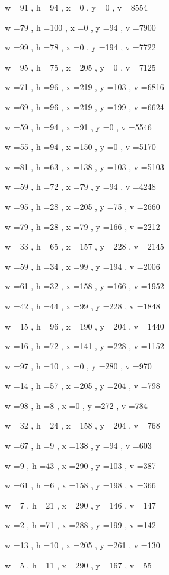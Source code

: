 \documentclass[11pt]{article}
\begin{document}
w =91 , h =94 , x =0 , y =0 , v =8554
\par
w =79 , h =100 , x =0 , y =94 , v =7900
\par
w =99 , h =78 , x =0 , y =194 , v =7722
\par
w =95 , h =75 , x =205 , y =0 , v =7125
\par
w =71 , h =96 , x =219 , y =103 , v =6816
\par
w =69 , h =96 , x =219 , y =199 , v =6624
\par
w =59 , h =94 , x =91 , y =0 , v =5546
\par
w =55 , h =94 , x =150 , y =0 , v =5170
\par
w =81 , h =63 , x =138 , y =103 , v =5103
\par
w =59 , h =72 , x =79 , y =94 , v =4248
\par
w =95 , h =28 , x =205 , y =75 , v =2660
\par
w =79 , h =28 , x =79 , y =166 , v =2212
\par
w =33 , h =65 , x =157 , y =228 , v =2145
\par
w =59 , h =34 , x =99 , y =194 , v =2006
\par
w =61 , h =32 , x =158 , y =166 , v =1952
\par
w =42 , h =44 , x =99 , y =228 , v =1848
\par
w =15 , h =96 , x =190 , y =204 , v =1440
\par
w =16 , h =72 , x =141 , y =228 , v =1152
\par
w =97 , h =10 , x =0 , y =280 , v =970
\par
w =14 , h =57 , x =205 , y =204 , v =798
\par
w =98 , h =8 , x =0 , y =272 , v =784
\par
w =32 , h =24 , x =158 , y =204 , v =768
\par
w =67 , h =9 , x =138 , y =94 , v =603
\par
w =9 , h =43 , x =290 , y =103 , v =387
\par
w =61 , h =6 , x =158 , y =198 , v =366
\par
w =7 , h =21 , x =290 , y =146 , v =147
\par
w =2 , h =71 , x =288 , y =199 , v =142
\par
w =13 , h =10 , x =205 , y =261 , v =130
\par
w =5 , h =11 , x =290 , y =167 , v =55
\par
\newpage
\end{document}
